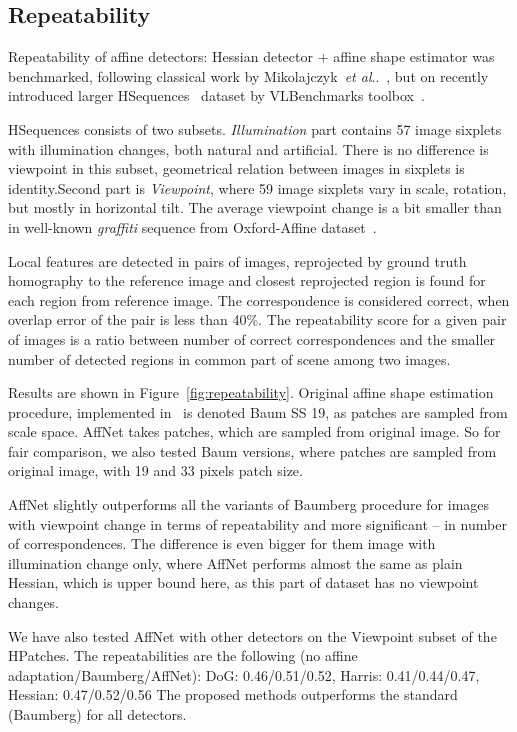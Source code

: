 \documentclass[runningheads]{llncs}
\makeatletter
\DeclareRobustCommand\onedot{\futurelet\@let@token\@onedot}
\def\@onedot{\ifx\@let@token.\else.\null\fi\xspace}
\def\etal{\emph{et al}\onedot}
\makeatother
\begin{document}
\subsection{Repeatability}\label{exp:rep}
Repeatability of affine detectors: Hessian detector + affine shape estimator was benchmarked, following classical work by Mikolajczyk~\etal~\cite{Mikolajczyk2005}, but on recently introduced larger HSequences~\cite{hpatches2017} dataset by VLBenchmarks toolbox~\cite{lenc2012vlbenchmarks}.

HSequences consists of two subsets. \textit{Illumination} part contains 57 image sixplets with illumination changes, both natural and artificial. There is no difference is viewpoint in this subset, geometrical relation between images in sixplets is identity.Second part is \textit{Viewpoint}, where 59 image sixplets vary in scale, rotation, but mostly in horizontal tilt. The average viewpoint change is a bit smaller than in well-known \emph{graffiti} sequence from Oxford-Affine dataset~\cite{Mikolajczyk2005}.

Local features are detected in pairs of images, reprojected by ground truth homography to the reference image and closest reprojected region is found for each region from reference image. The correspondence is considered correct, when overlap error of the pair is less than 40\%. The repeatability score for a given pair of images is a ratio between number of correct correspondences and the smaller number of detected regions in common part of scene among two images. 

Results are shown in Figure~\ref{fig:repeatability}. Original affine shape estimation procedure, implemented in~\cite{Perdoch-CVPR2009efficient} is denoted Baum SS 19, as  patches are sampled from scale space. AffNet takes  patches, which are sampled from original image. So for fair comparison, we also tested Baum versions, where patches are sampled from original image, with 19 and 33 pixels patch size.

AffNet slightly outperforms all the variants of Baumberg procedure for images with viewpoint change in terms of repeatability and more significant -- in number of correspondences.
The difference is even bigger for them image with illumination change only, where AffNet performs almost the same as plain Hessian, which is upper bound here, as this part of dataset has no viewpoint changes. 

We have also tested AffNet with other detectors on the Viewpoint subset of the HPatches. The repeatabilities are the following (no affine adaptation/Baumberg/AffNet): DoG: 0.46/0.51/0.52, Harris: 0.41/0.44/0.47, Hessian: 0.47/0.52/0.56
The proposed methods outperforms the standard (Baumberg) for all detectors. 
\end{document}
